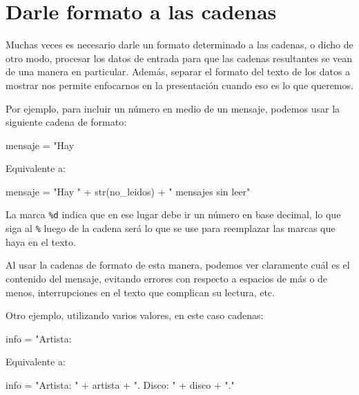\begin{enumerate}



\end{enumerate}

\section{Darle formato a las cadenas}

Muchas veces es necesario darle un formato determinado a las cadenas, o dicho de
otro modo, procesar los datos de entrada para que las cadenas resultantes se
vean de una manera en particular. Además, separar el formato del texto de los
datos a mostrar nos permite enfocarnos en la presentación cuando eso es lo que
queremos.

Por ejemplo, para incluir un número en medio de un mensaje, podemos usar la
siguiente cadena de formato:
\begin{codigo-python-sn}
mensaje = "Hay %
\end{codigo-python-sn}

Equivalente a:
\begin{codigo-python-sn}
mensaje = "Hay " + str(no_leidos) + " mensajes sin leer"
\end{codigo-python-sn}

La marca \lstinline!%d! indica que en ese lugar debe ir un número en base
decimal, lo que siga al \lstinline!%! luego de la cadena será lo que se use para
reemplazar las marcas que haya en el texto.

Al usar la cadenas de formato de
esta manera, podemos ver claramente cuál es el contenido del mensaje, evitando
errores con respecto a espacios de más o de menos, interrupciones en el texto
que complican su lectura, etc.

Otro ejemplo, utilizando varios valores, en este caso cadenas:
\begin{codigo-python-sn}
info = "Artista: %
\end{codigo-python-sn}

Equivalente a:
\begin{codigo-python-sn}
info = "Artista: " + artista + ". Disco: " + disco + "."
\end{codigo-python-sn}

